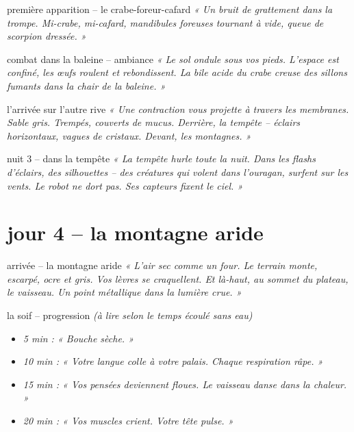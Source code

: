 \documentclass[10pt, a4paper]{article}
\begin{document}
\begin{creaturebox}{première apparition -- le crabe-foreur-cafard}
\textit{« Un bruit de grattement dans la trompe. Mi-crabe, mi-cafard, mandibules foreuses tournant à vide, queue de scorpion dressée. »}
\end{creaturebox}

\begin{momentbox}{combat dans la baleine -- ambiance}
\textit{« Le sol ondule sous vos pieds. L'espace est confiné, les œufs roulent et rebondissent. La bile acide du crabe creuse des sillons fumants dans la chair de la baleine. »}
\end{momentbox}

\begin{momentbox}{l'arrivée sur l'autre rive}
\textit{« Une contraction vous projette à travers les membranes. Sable gris. Trempés, couverts de mucus. Derrière, la tempête -- éclairs horizontaux, vagues de cristaux. Devant, les montagnes. »}
\end{momentbox}

\begin{transitionbox}{nuit 3 -- dans la tempête}
\textit{« La tempête hurle toute la nuit. Dans les flashs d'éclairs, des silhouettes -- des créatures qui volent dans l'ouragan, surfent sur les vents. Le robot ne dort pas. Ses capteurs fixent le ciel. »}
\end{transitionbox}

\section*{jour 4 -- la montagne aride}

\begin{zonebox}{arrivée -- la montagne aride}
\textit{« L'air sec comme un four. Le terrain monte, escarpé, ocre et gris. Vos lèvres se craquellent. Et là-haut, au sommet du plateau, le vaisseau. Un point métallique dans la lumière crue. »}
\end{zonebox}

\begin{momentbox}{la soif -- progression}
\textit{(à lire selon le temps écoulé sans eau)}
\begin{itemize}
    \item \textit{5 min : « Bouche sèche. »}
    \item \textit{10 min : « Votre langue colle à votre palais. Chaque respiration râpe. »}
    \item \textit{15 min : « Vos pensées deviennent floues. Le vaisseau danse dans la chaleur. »}
    \item \textit{20 min : « Vos muscles crient. Votre tête pulse. »}
\end{itemize}
\end{momentbox}
\end{document}
